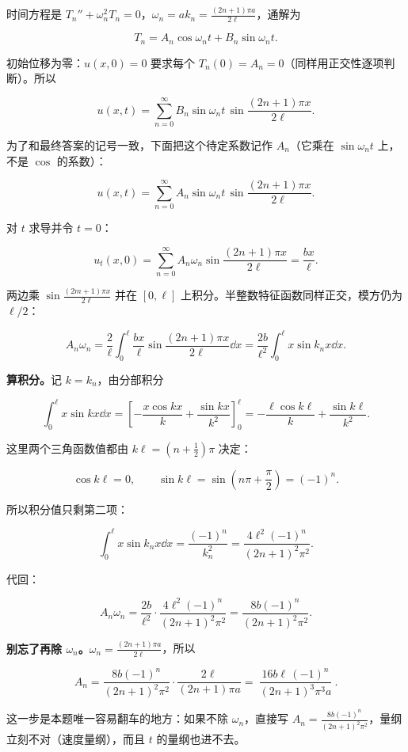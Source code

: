 \documentclass[11pt]{ctexart}
\begin{document}

时间方程是 $T_n''+\omega_n^2T_n=0$，$\omega_n=ak_n=\frac{(2n+1)\pi a}{2\ell}$，通解为

\[
T_n=A_n\cos\omega_nt+B_n\sin\omega_nt .
\]

初始位移为零：$u(x,0)=0$ 要求每个 $T_n(0)=A_n=0$（同样用正交性逐项判断）。所以

\[
u(x,t)=\sum_{n=0}^{\infty}B_n\sin\omega_nt\,\sin\frac{(2n+1)\pi x}{2\ell}.
\]

为了和最终答案的记号一致，下面把这个待定系数记作 $A_n$（它乘在 $\sin\omega_nt$ 上，不是 $\cos$ 的系数）：

\[
u(x,t)=\sum_{n=0}^{\infty}A_n\sin\omega_nt\,\sin\frac{(2n+1)\pi x}{2\ell}.
\]


对 $t$ 求导并令 $t=0$：

\[
u_t(x,0)=\sum_{n=0}^{\infty}A_n\omega_n\sin\frac{(2n+1)\pi x}{2\ell}=\frac{bx}{\ell}.
\]

两边乘 $\sin\frac{(2m+1)\pi x}{2\ell}$ 并在 $[0,\ell]$ 上积分。半整数特征函数同样正交，模方仍为 $\ell/2$：

\[
A_n\omega_n=\frac{2}{\ell}\int_0^{\ell}\frac{bx}{\ell}\sin\frac{(2n+1)\pi x}{2\ell}\dd x
=\frac{2b}{\ell^2}\int_0^{\ell}x\sin k_nx\dd x .
\]

\textbf{算积分。}记 $k=k_n$，由分部积分

\[
\int_0^{\ell}x\sin kx\dd x
=\left[-\frac{x\cos kx}{k}+\frac{\sin kx}{k^2}\right]_0^{\ell}
=-\frac{\ell\cos k\ell}{k}+\frac{\sin k\ell}{k^2}.
\]

这里两个三角函数值都由 $k\ell=(n+\tfrac12)\pi$ 决定：

\[
\cos k\ell=0,
\qquad
\sin k\ell=\sin\left(n\pi+\frac{\pi}{2}\right)=(-1)^n .
\]

所以积分值只剩第二项：

\[
\int_0^{\ell}x\sin k_nx\dd x=\frac{(-1)^n}{k_n^2}
=\frac{4\ell^2(-1)^n}{(2n+1)^2\pi^2}.
\]

代回：

\[
A_n\omega_n=\frac{2b}{\ell^2}\cdot\frac{4\ell^2(-1)^n}{(2n+1)^2\pi^2}
=\frac{8b(-1)^n}{(2n+1)^2\pi^2}.
\]

\textbf{别忘了再除 $\omega_n$。}$\omega_n=\frac{(2n+1)\pi a}{2\ell}$，所以

\[
A_n=\frac{8b(-1)^n}{(2n+1)^2\pi^2}\cdot\frac{2\ell}{(2n+1)\pi a}
=\boxed{\ \frac{16b\ell\,(-1)^n}{(2n+1)^3\pi^3a}\ }.
\]

这一步是本题唯一容易翻车的地方：如果不除 $\omega_n$，直接写 $A_n=\frac{8b(-1)^n}{(2n+1)^2\pi^2}$，量纲立刻不对（速度量纲），而且 $t$ 的量纲也进不去。
\end{document}
